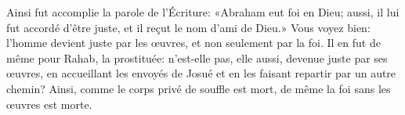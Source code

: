 Ainsi fut accomplie la parole de l’Écriture:
	«Abraham eut foi en Dieu;
	aussi, il lui fut accordé d’être juste, et il reçut le nom d’ami de Dieu.»
Vous voyez bien:
	l’homme devient juste par les œuvres, et non seulement par la foi.
Il en fut de même pour Rahab, la prostituée:
	n’est-elle pas, elle aussi, devenue juste par ses œuvres,
	en accueillant les envoyés de Josué et en les faisant repartir par un autre chemin?
Ainsi, comme le corps privé de souffle est mort,
	de même la foi sans les œuvres est morte.
